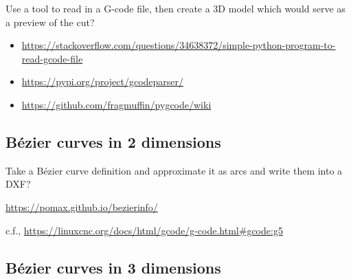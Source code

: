 \documentclass{ltxdoc}
\begin{document}
Use a tool to read in a G-code file, then create a 3D model which would serve as a preview of the cut?

\begin{itemize}
\item \url{https://stackoverflow.com/questions/34638372/simple-python-program-to-read-gcode-file}
\item \url{https://pypi.org/project/gcodeparser/}
\item \url{https://github.com/fragmuffin/pygcode/wiki}
\end{itemize} 
 
\subsection{Bézier curves in 2 dimensions}

Take a Bézier curve definition and approximate it as arcs and write them into a DXF?

\url{https://pomax.github.io/bezierinfo/}

c.f., \url{https://linuxcnc.org/docs/html/gcode/g-code.html#gcode:g5}

%
%
%
%
%
%
%
%

\subsection{Bézier curves in 3 dimensions}
 
\end{document}
